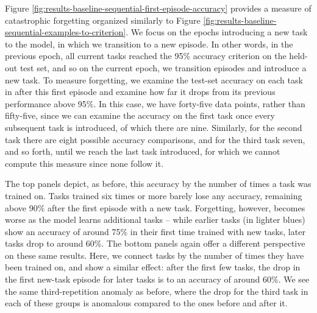 Figure \ref{fig:results-baseline-sequential-first-episode-accuracy} provides a measure of catastrophic forgetting organized similarly to Figure \ref{fig:results-baseline-sequential-examples-to-criterion}. We focus on the epochs introducing a new task to the model, in which we transition to a new episode. In other words, in the previous epoch, all current tasks reached the 95\% accuracy criterion on the held-out test set, and so on the current epoch, we transition episodes and introduce a new task. To measure forgetting, we examine the test-set accuracy on each task in after this first episode and examine how far it drops from its previous performance above 95\%. In this case, we have forty-five data points, rather than fifty-five, since we can examine the accuracy on the first task once every subsequent task is introduced, of which there are nine. Similarly, for the second task there are eight possible accuracy comparisons, and for the third task seven, and so forth, until we reach the last task introduced, for which we cannot compute this measure since none follow it.

The top panels depict, as before, this accuracy by the number of times a task was trained on. Tasks trained six times or more barely lose any accuracy, remaining above 90\% after the first episode with a new task. Forgetting, however, becomes worse as the model learns additional tasks -- while earlier tasks (in lighter blues) show an accuracy of around 75\% in their first time trained with new tasks, later tasks drop to around 60\%. The bottom panels again offer a different perspective on these same results. Here, we connect tasks by the number of times they have been trained on, and show a similar effect: after the first few tasks, the drop in the first new-task episode for later tasks is to an accuracy of around 60\%. We see the same third-repetition anomaly as before, where the drop for the third task in each of these groups is anomalous compared to the ones before and after it. 
